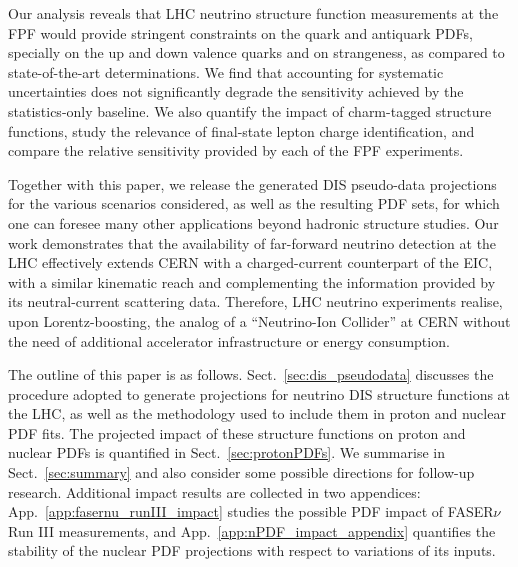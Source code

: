 Our analysis reveals that  LHC neutrino structure function measurements at the FPF
would  provide  stringent constraints
on the quark and antiquark PDFs, specially on the up and down
valence quarks and on strangeness, as compared to state-of-the-art determinations.
%
We find that accounting for systematic uncertainties does not significantly
degrade the sensitivity achieved by the statistics-only baseline.
%
We also quantify the impact of charm-tagged structure functions, study the relevance
of final-state lepton charge identification, and compare the relative sensitivity
provided by each of the FPF experiments.

Together with this paper, we release the generated  DIS pseudo-data projections for the various scenarios
considered, as well as the resulting PDF sets, for which one can foresee
many other applications beyond hadronic structure studies.
%
Our work demonstrates that the availability of far-forward neutrino detection
at the LHC effectively
extends CERN with a charged-current counterpart of the EIC,
with a similar kinematic reach and complementing
the information provided by its neutral-current scattering data.
%
Therefore, LHC neutrino experiments realise, upon Lorentz-boosting, the analog of
a ``Neutrino-Ion Collider'' at CERN
without the need of additional accelerator infrastructure or energy consumption.

The outline of this paper is as follows.
%
Sect.~\ref{sec:dis_pseudodata} discusses the procedure
adopted to generate projections for neutrino DIS structure functions at the LHC,
as well as the methodology used
to include them in proton and nuclear PDF fits.
%
The projected impact of these structure functions on proton and nuclear
PDFs is quantified in Sect.~\ref{sec:protonPDFs}.
%
We summarise in Sect.~\ref{sec:summary} and also consider some possible
directions for follow-up research.
%
Additional impact results are collected in two appendices:
App.~\ref{app:fasernu_runIII_impact} studies the possible PDF impact
of FASER$\nu$ Run III measurements, and App.~\ref{app:nPDF_impact_appendix}
quantifies the stability of the nuclear PDF projections with respect
to variations of its inputs.
